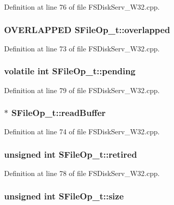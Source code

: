 Definition at line 76 of file FSDiskServ\_\-W32.cpp.\hypertarget{struct_s_file_op__t_7580e2d7725d9e62b6f01af716882b5a}{
\subsubsection[{overlapped}]{\setlength{\rightskip}{0pt plus 5cm}OVERLAPPED {\bf SFileOp\_\-t::overlapped}}}
\label{struct_s_file_op__t_7580e2d7725d9e62b6f01af716882b5a}




Definition at line 73 of file FSDiskServ\_\-W32.cpp.\hypertarget{struct_s_file_op__t_5d5cf61968a0cb6006012635d2754544}{
\subsubsection[{pending}]{\setlength{\rightskip}{0pt plus 5cm}volatile int {\bf SFileOp\_\-t::pending}}}
\label{struct_s_file_op__t_5d5cf61968a0cb6006012635d2754544}




Definition at line 79 of file FSDiskServ\_\-W32.cpp.\hypertarget{struct_s_file_op__t_a85b29f1d72b6b477e9e4ba93f18be1c}{
\subsubsection[{readBuffer}]{$\ast$ {\bf SFileOp\_\-t::readBuffer}}}
\label{struct_s_file_op__t_a85b29f1d72b6b477e9e4ba93f18be1c}




Definition at line 74 of file FSDiskServ\_\-W32.cpp.\hypertarget{struct_s_file_op__t_b7c0b908f7ae23db0ed6963eb79335e8}{
\subsubsection[{retired}]{\setlength{\rightskip}{0pt plus 5cm}unsigned int {\bf SFileOp\_\-t::retired}}}
\label{struct_s_file_op__t_b7c0b908f7ae23db0ed6963eb79335e8}




Definition at line 78 of file FSDiskServ\_\-W32.cpp.\hypertarget{struct_s_file_op__t_3d23fc9294b4099d03479ecc39867c5d}{
\subsubsection[{size}]{\setlength{\rightskip}{0pt plus 5cm}unsigned int {\bf SFileOp\_\-t::size}}}
\label{struct_s_file_op__t_3d23fc9294b4099d03479ecc39867c5d}




